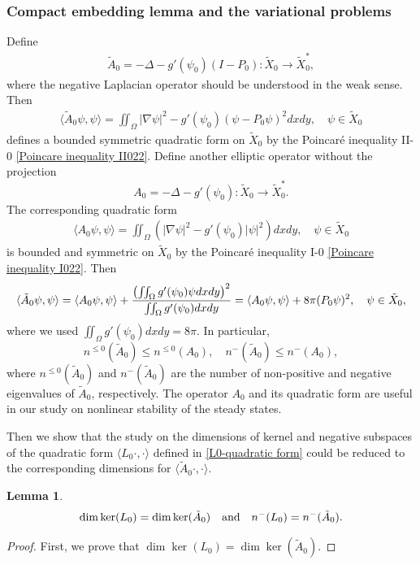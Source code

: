 \documentclass[1 [leqno, 11pt]{amsart}
\numberwithin{equation}{section}
\newtheorem{lemma}[Theorem]{Lemma}
\begin{document}
\begin{CJK*}{GBK}{song}
\subsubsection{Compact embedding lemma   and the variational problems}
Define
 \begin{align}\label{A0}
 \tilde{A}_0=-\Delta-g'(\psi_0)(I - P_0): \tilde{X}_0 \rightarrow \tilde{X}_0^*,
\end{align}
where the negative Laplacian operator should be understood in the weak sense.
Then
\begin{align}\label{A0-quadratic form}
 \langle\tilde{A}_0\psi,\psi\rangle=\iint_\Omega|\nabla\psi|^2-g'(\psi_0)(\psi - P_0\psi)^2dxdy,\quad\psi\in \tilde{X}_0
\end{align}
defines a  bounded symmetric quadratic form on $\tilde{X}_0$ by the Poincar\'e inequality II-0 \eqref{Poincare inequality II022}.
Define another elliptic operator without the projection
\begin{equation}\label{A0 without projection}
A_0 =-\Delta -g'(\psi_0):\tilde{X}_0 \rightarrow \tilde{X}_0^*.
\end{equation}
The corresponding quadratic form
\begin{align*}
\langle A_0 \psi,\psi\rangle=\iint_{\Omega}\left(|\nabla \psi|^2-g'(\psi_0)|\psi|^2\right)dxdy,\quad\psi\in \tilde{X}_0
\end{align*}
is bounded and symmetric  on $\tilde{X}_0$ by the Poincar\'e inequality I-$0$ \eqref{Poincare inequality I022}.
Then
\begin{align}\label{tilde A0-A0}
\langle\tilde  A_0 \psi,\psi\rangle=\langle A_0 \psi,\psi\rangle+{\left(\iint_\Omega g'(\psi_0)\psi dxdy\right)^2\over \iint_\Omega g'(\psi_0)dxdy}=\langle A_0 \psi,\psi\rangle+8\pi(P_0 \psi)^2,\quad \psi\in\tilde X_0,
\end{align}
where we used $ \iint_\Omega g'(\psi_0)dxdy=8\pi$.
In particular,
\begin{equation*}
n^{\leq0}(\tilde A_0)\leq n^{\leq0}(A_0),\quad n^{-}(\tilde A_0)\leq n^{-}(A_0),
\end{equation*}
where $n^{\leq0}(\tilde A_0)$ and $n^-(\tilde A_0)$ are the number of non-positive and negative eigenvalues of $\tilde A_0$, respectively.
The operator $A_0$ and its quadratic form are useful in our study on nonlinear stability of the steady states.

Then we show that the study  on the dimensions of kernel and negative subspaces of the quadratic form $\langle L_0\cdot,\cdot\rangle$
defined in \eqref{L0-quadratic form}
  could be reduced to the corresponding dimensions for $ \langle\tilde{A}_0\cdot,\cdot\rangle$.
\begin{lemma}\label{equal-indices0}
\begin{align*}
\dim\ker(L_0)=\dim\ker(\tilde{A}_0) \quad {\rm{and}} \quad n^-(L_0)=n^-(\tilde{A}_0).
\end{align*}
\end{lemma}
\begin{proof}
First, we prove that $\dim\ker(L_0) =\dim\ker(\tilde{A}_0)$.


\end{proof}
\end{CJK*}
\end{document}
